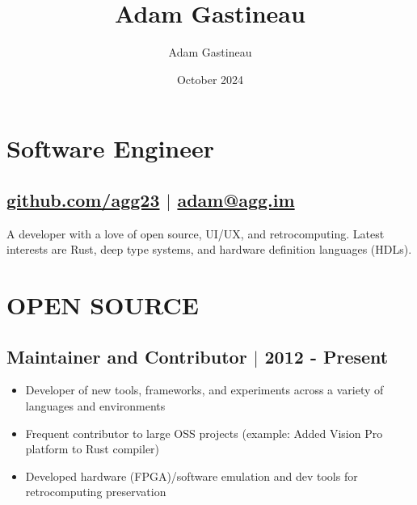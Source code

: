 \documentclass[10pt]{article}
\title{Adam Gastineau}
\author{Adam Gastineau}
\date{October 2024}
\begin{document}
\thispagestyle{empty}

\begin{flushleft}
{\huge\bfseries\theauthor}
\end{flushleft}

\vspace{-38pt}
\begin{flushright}
\end{flushright}
\vspace{-1in}\vspace{6pt}

\section{Software Engineer}
\subsection{\href{https://github.com/agg23}{github.com/agg23} $\vert$ \href{mailto:adam@agg.im}{adam@agg.im}}
\parbox{380pt}{\color{darkgrey}A developer with a love of open source, UI/UX, and retrocomputing. Latest interests are Rust, deep type systems, and hardware definition languages (HDLs).}

\vspace{8pt}
\noindent
{}

\vspace{-8pt}


\section{OPEN SOURCE}
\subsection{Maintainer and Contributor $\vert$ 2012 - Present}
\begin{itemize}
    \item Developer of new tools, frameworks, and experiments across a variety of languages and environments
    \item Frequent contributor to large OSS projects (example: Added Vision Pro platform to Rust compiler)
    \item Developed hardware (FPGA)/software emulation and dev tools for retrocomputing preservation
\end{itemize}
\end{document}
